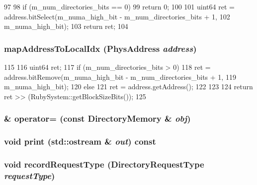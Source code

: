 \begin{DoxyCode}
97 {
98     if (m_num_directories_bits == 0)
99         return 0;
100 
101     uint64 ret = address.bitSelect(m_numa_high_bit - m_num_directories_bits + 1,
102                                    m_numa_high_bit);
103     return ret;
104 }
\end{DoxyCode}
\hypertarget{classDirectoryMemory_a1f5e94201944cc2280763bacdd2434a9}{
\subsubsection[{mapAddressToLocalIdx}]{ mapAddressToLocalIdx ({\bf PhysAddress} {\em address})}}
\label{classDirectoryMemory_a1f5e94201944cc2280763bacdd2434a9}



\begin{DoxyCode}
115 {
116     uint64 ret;
117     if (m_num_directories_bits > 0) {
118         ret = address.bitRemove(m_numa_high_bit - m_num_directories_bits + 1,
119                                 m_numa_high_bit);
120     } else {
121         ret = address.getAddress();
122     }
123 
124     return ret >> (RubySystem::getBlockSizeBits());
125 }
\end{DoxyCode}
\hypertarget{classDirectoryMemory_a6879b807bfd1fc1e7bc5d04d725e460d}{
\subsubsection[{operator=}]{\& operator= (const {\bf DirectoryMemory} \& {\em obj})}}
\label{classDirectoryMemory_a6879b807bfd1fc1e7bc5d04d725e460d}
\hypertarget{classDirectoryMemory_ac55fe386a101fbae38c716067c9966a0}{
\subsubsection[{print}]{\setlength{\rightskip}{0pt plus 5cm}void print (std::ostream \& {\em out}) const}}
\label{classDirectoryMemory_ac55fe386a101fbae38c716067c9966a0}
\hypertarget{classDirectoryMemory_ae401a64c076a01d8abf4d4ebce5712f3}{
\subsubsection[{recordRequestType}]{\setlength{\rightskip}{0pt plus 5cm}void recordRequestType (DirectoryRequestType {\em requestType})}}
\label{classDirectoryMemory_ae401a64c076a01d8abf4d4ebce5712f3}



